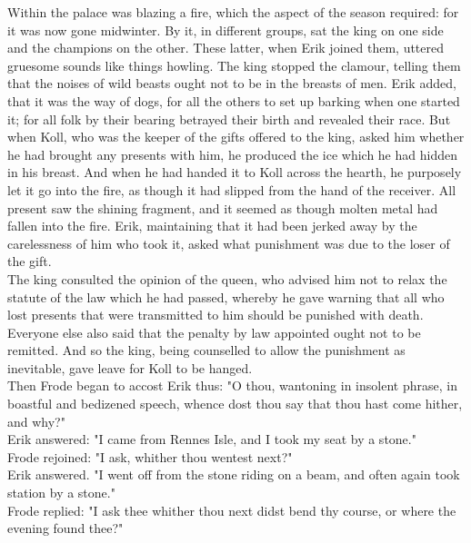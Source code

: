 \documentclass[10pt,a4paper]{report}
\begin{document}
Within the palace was blazing a fire, which the aspect of the season required: for it was now gone midwinter. By it, in different groups, sat the king on one side and the champions on the other. These latter, when Erik joined them, uttered gruesome sounds like things howling. The king stopped the clamour, telling them that the noises of wild beasts ought not to be in the breasts of men. Erik added, that it was the way of dogs, for all the others to set up barking when one started it; for all folk by their bearing betrayed their birth and revealed their race. But when Koll, who was the keeper of the gifts offered to the king, asked him whether he had brought any presents with him, he produced the ice which he had hidden in his breast. And when he had handed it to Koll across the hearth, he purposely let it go into the fire, as though it had slipped from the hand of the receiver. All present saw the shining fragment, and it seemed as though molten metal had fallen into the fire. Erik, maintaining that it had been jerked away by the carelessness of him who took it, asked what punishment was due to the loser of the gift.\\

The king consulted the opinion of the queen, who advised him not to relax the statute of the law which he had passed, whereby he gave warning that all who lost presents that were transmitted to him should be punished with death. Everyone else also said that the penalty by law appointed ought not to be remitted. And so the king, being counselled to allow the punishment as inevitable, gave leave for Koll to be hanged.\\

Then Frode began to accost Erik thus: "O thou, wantoning in insolent phrase, in boastful and bedizened speech, whence dost thou say that thou hast come hither, and why?"\\

Erik answered: "I came from Rennes Isle, and I took my seat by a stone."\\

Frode rejoined: "I ask, whither thou wentest next?"\\

Erik answered. "I went off from the stone riding on a beam, and often again took station by a stone."\\

Frode replied: "I ask thee whither thou next didst bend thy course, or where the evening found thee?"\\
\end{document}
